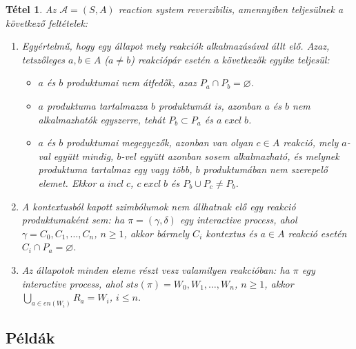 \documentclass[12pt]{article}
\theoremstyle{definition}
\theoremstyle{remark}
\theoremstyle{plain}
\newtheorem*{theorem*}{Tétel}
\let\emptyset\varnothing
\newcommand{\excl}{\; \textit{excl} \;}
\newcommand{\incl}{\; \textit{incl} \;}
\begin{document}
    \begin{theorem*}
        Az $\mathscr{A} = (S, A)$ \textit{reaction system} reverzibilis, amennyiben teljesülnek a következő feltételek:
        \begin{enumerate}[label={(\arabic*)}]
            \item
            Egyértelmű, hogy egy állapot mely reakciók alkalmazásával állt elő. Azaz, tetszőleges $a, b \in A$ ($a \neq b$) reakciópár esetén a következők egyike teljesül:
            \begin{itemize}
                \item
                $a$ és $b$ produktumai nem átfedők, azaz $P_{a} \cap P_{b} = \emptyset$.

                \item
                $a$ produktuma tartalmazza $b$ produktumát is, azonban $a$ és $b$ nem alkalmazhatók egyszerre, tehát $P_{b} \subset P_{a}$ és $a \excl b$.

                \item
                $a$ és $b$ produktumai megegyezők, azonban van olyan $c \in A$ reakció, mely $a$-val együtt mindig, $b$-vel együtt azonban sosem alkalmazható, és melynek produktuma tartalmaz egy vagy több, $b$ produktumában nem szerepelő elemet. Ekkor $a \incl c$, $c \excl b$ és $P_{b} \cup P_{c} \neq P_{b}$.
            \end{itemize} 

            \item
            A kontextusból kapott szimbólumok nem állhatnak elő egy reakció produktumaként sem: ha $\pi = (\gamma, \delta)$ egy \textit{interactive process}, ahol $\gamma = C_{0}, C_{1}, \ldots, C_{n}$, $n \geq 1$, akkor bármely $C_{i}$ kontextus és $a \in A$ reakció esetén $C_{i} \cap P_{a} = \emptyset$.

            \item
            Az állapotok minden eleme részt vesz valamilyen reakcióban: ha $\pi$ egy \textit{interactive process}, ahol $\textit{sts}(\pi) = W_{0}, W_{1}, \ldots, W_{n}$, $n \geq 1$, akkor $\bigcup_{a \in \textit{en}(W_{i})} R_{a} = W_{i}$, $i \leq n$.
        \end{enumerate}
    \end{theorem*}

    \subsection*{Példák}
\end{document}
